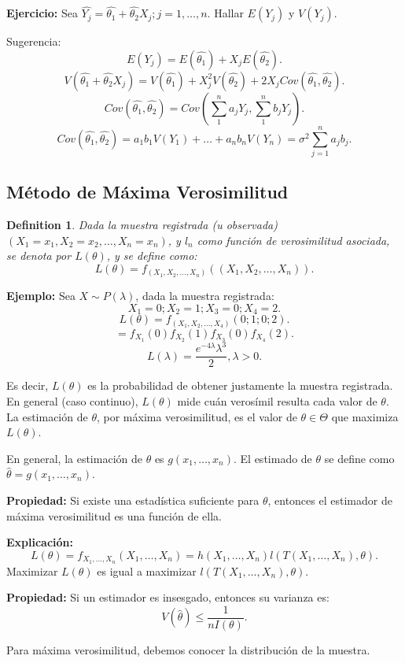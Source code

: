 \documentclass{article}
\newtheorem{mydef}{Definition}
\begin{document}
\textbf{Ejercicio: } Sea $\hat{Y_{j}}= \hat{\theta_{1}}+\hat{\theta_{2}}X_{j}; j=1,\ldots,n$. Hallar $E{(Y_{j})}$ y $V{(Y_{j})}$.

Sugerencia:
\[ E{(Y_{j})}=E{(\hat{\theta_{1}})}+X_{j}E{(\hat{\theta_{2}})}.\]
\[ V{(\hat{\theta_{1}}+\hat{\theta_{2}}X_{j})}=V{(\hat{\theta_{1}})}+X_{j}^{2}V{(\hat{\theta_{2}})}+2 X_{j}Cov{(\hat{\theta_{1}},\hat{\theta_{2}})}.\]
\[ Cov{(\hat{\theta_{1}},\hat{\theta_{2}})}=Cov{(\sum_{1}^{n}a_{j}Y_{j},\sum_{1}^{n}b_{j}Y_{j})}.\]
\[ Cov{(\hat{\theta_{1}},\hat{\theta_{2}})}=a_{1}b_{1}V{(Y_{1})}+\ldots+a_{n}b_{n}V{(Y_{n})}=\sigma^{2}\sum_{j=1}^{n}a_{j}b_{j}.\]

\subsection{Método de Máxima Verosimilitud}
\begin{mydef}
	Dada la muestra registrada (u observada) $(X_{1}=x_{1},X_{2}=x_{2},\ldots,X_{n}=x_{n})$, y $l_{n}$ como función de verosimilitud asociada, se denota por $L{(\theta)}$, y se define como:
	\[ L{(\theta)}=f_{(X_{1},X_{2},\ldots,X_{n})}{((X_{1},X_{2},\ldots,X_{n}))}.\]
\end{mydef}

\textbf{Ejemplo: }Sea $X\sim P{(\lambda)}$, dada la muestra registrada:
\[ X_{1}=0;X_{2}=1;X_{3}=0;X_{4}=2.\]
\[ L{(\theta)}=f_{(X_{1},X_{2},\ldots,X_{4})}{(0;1;0;2)}.\]
\[ =f_{X_{1}}{(0)}f_{X_{2}}{(1)}f_{X_{3}}{(0)}f_{X_{4}}{(2)}.\]
\[ L{(\lambda)}=\frac{e^{-4\lambda}\lambda^{3}}{2},\lambda>0.\]

Es decir, $L{(\theta)}$ es la probabilidad de obtener justamente la muestra registrada. En general (caso continuo), $L{(\theta)}$ mide cuán verosímil resulta cada valor de $\theta$. La estimación de $\theta$, por máxima verosimilitud, es el valor de $\theta \in \Theta$ que maximiza $L{(\theta)}$.

En general, la estimación de $\theta$ es $g{(x_{1},\ldots,x_{n})}$. El estimado de $\theta$ se define como $\hat{\theta}=g{(x_{1},\ldots,x_{n})}$.

\textbf{Propiedad: } Si existe una estadística suficiente para $\theta$, entonces el estimador de máxima verosimilitud es una función de ella.

\textbf{Explicación:}
\[ L{(\theta)}=f_{X_{1},\ldots,X_{n}}{(X_{1},\ldots,X_{n})}=h{(X_{1},\ldots,X_{n})}l{(T{(X_{1},\ldots,X_{n})},\theta)}.\]
Maximizar $L{(\theta)}$ es igual a maximizar $l{(T{(X_{1},\ldots,X_{n})},\theta)}$.

\textbf{Propiedad: } Si un estimador es insesgado, entonces su varianza es:
\[ V{(\hat{\theta})}\leq \frac{1}{n I{(\theta)}}.\]

Para máxima verosimilitud, debemos conocer la distribución de la muestra.
\end{document}
